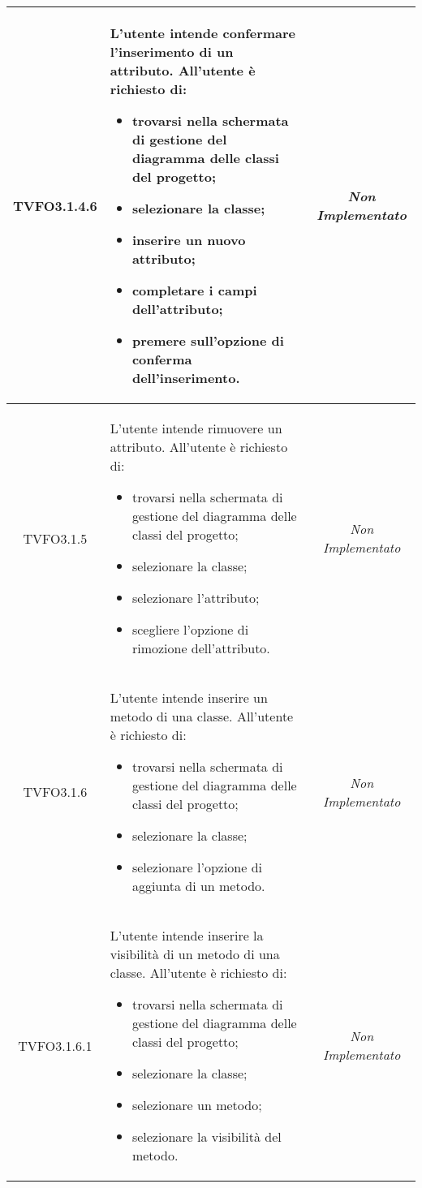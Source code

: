 \begin{longtable}{|c|>{}m{8cm}|c|}
\hypertarget{TVFO3.1.4.6}{TVFO3.1.4.6} & L'utente intende confermare l'inserimento di un attributo. All'utente è richiesto di: 
\begin{itemize} 
\item trovarsi nella schermata di gestione del diagramma delle classi del progetto;
\item selezionare la classe;
\item inserire un nuovo attributo;
\item completare i campi dell'attributo;
\item premere sull'opzione di conferma dell'inserimento.
\end{itemize} & \textit{Non Implementato}\\ \hline
\hypertarget{TVFO3.1.5}{TVFO3.1.5} & L'utente intende rimuovere un attributo.
All'utente è richiesto di:
\begin{itemize}
\item trovarsi nella schermata di gestione del diagramma delle classi del progetto;
\item selezionare la classe;
\item selezionare l'attributo;
\item scegliere l'opzione di rimozione dell'attributo.
\end{itemize} & \textit{Non Implementato}\\ \hline
\hypertarget{TVFO3.1.6}{TVFO3.1.6} & L'utente intende inserire un metodo di una classe.
All'utente è richiesto di:
\begin{itemize}
\item trovarsi nella schermata di gestione del diagramma delle classi del progetto;
\item selezionare la classe;
\item selezionare l'opzione di aggiunta di un metodo.
\end{itemize} & \textit{Non Implementato}\\ \hline
\hypertarget{TVFO3.1.6.1}{TVFO3.1.6.1} & L'utente intende inserire la visibilità di un metodo di una classe.
All'utente è richiesto di:
\begin{itemize}
\item trovarsi nella schermata di gestione del diagramma delle classi del progetto;
\item selezionare la classe;
\item selezionare un metodo;
\item selezionare la visibilità del metodo.
\end{itemize} & \textit{Non Implementato}\\ \hline

\end{longtable}
